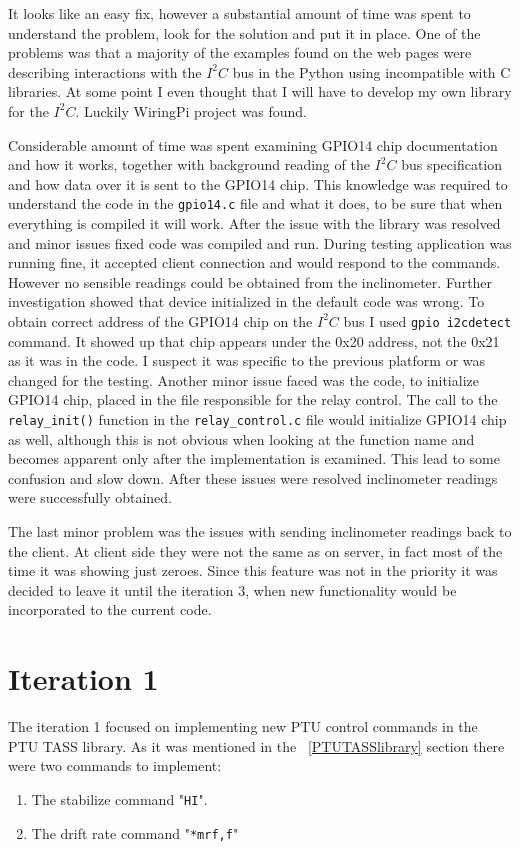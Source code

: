 It looks like an easy fix, however a substantial amount of time was spent to understand the problem, look for the solution and put it in place. One of the problems was that a majority of the examples found on the web pages were describing interactions with the $I^2C$ bus in the Python using incompatible with C libraries. At some point I even thought that I will have to develop my own library for the $I^2C$. Luckily WiringPi project was found.

Considerable amount of time was spent examining GPIO14 chip documentation and how it works, together with background reading of the $I^2C$ bus specification and how data over it is sent to the GPIO14 chip. This knowledge was required to understand the code in the \texttt{gpio14.c} file and what it does, to be sure that when everything is compiled it will work.
\newline
\newline
After the issue with the library was resolved and minor issues fixed code was compiled and run. During testing application was running fine, it accepted client connection and would respond to the commands. However no sensible readings could be obtained from the inclinometer. Further investigation showed that device initialized in the default code was wrong. To obtain correct address of the GPIO14 chip on the $I^2C$ bus I used \texttt{gpio i2cdetect} command. It showed up that chip appears under the 0x20 address, not the 0x21 as it was in the code. I suspect it was specific to the previous platform or was changed for the testing. Another minor issue faced was the code, to initialize GPIO14 chip, placed in the file responsible for the relay control. The call to the \texttt{relay\_init()} function in the \texttt{relay\_control.c} file would initialize GPIO14 chip as well, although this is not obvious when looking at the function name and becomes apparent only after the implementation is examined. This lead to some confusion and slow down. After these issues were resolved inclinometer readings were successfully obtained. 

The last minor problem was the issues with sending inclinometer readings back to the client. At client side they were not the same as on server, in fact most of the time it was showing just zeroes. Since this feature was not in the priority it was decided to leave it until the iteration 3, when new functionality would be incorporated to the current code.

\section{Iteration 1}
The iteration 1 focused on implementing new PTU control commands in the PTU TASS library. As it was mentioned in the ~\ref{PTUTASSlibrary} section there were two commands to implement:
\begin{enumerate}
\item The stabilize command "\texttt{HI}".
\item The drift rate command "\texttt{*mrf,f}"
\end{enumerate}

